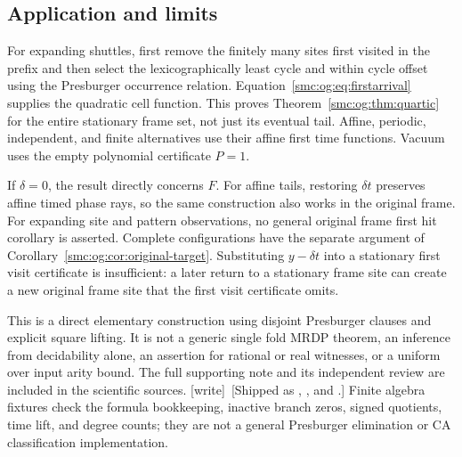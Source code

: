 \documentclass[11pt,letterpaper]{article}
\numberwithin{equation}{section}
\theoremstyle{definition}
\theoremstyle{remark}
\newcommand{\wtag}{\textup{[write]}}
\begin{document}
\subsection{Application and limits}
For expanding shuttles, first remove the finitely many sites first visited in the prefix and then select the lexicographically least cycle and within cycle offset using the Presburger occurrence relation. Equation~\eqref{smc:og:eq:firstarrival} supplies the quadratic cell function. This proves Theorem~\ref{smc:og:thm:quartic} for the entire stationary frame set, not just its eventual tail. Affine, periodic, independent, and finite alternatives use their affine first time functions. Vacuum uses the empty polynomial certificate $P=1$.

If $\delta=0$, the result directly concerns $F$. For affine tails, restoring $\delta t$ preserves affine timed phase rays, so the same construction also works in the original frame. For expanding site and pattern observations, no general original frame first hit corollary is asserted. Complete configurations have the separate argument of Corollary~\ref{smc:og:cor:original-target}. Substituting $y-\delta t$ into a stationary first visit certificate is insufficient: a later return to a stationary frame site can create a new original frame site that the first visit certificate omits.

This is a direct elementary construction using disjoint Presburger clauses and explicit square lifting. It is not a generic single fold MRDP theorem, an inference from decidability alone, an assertion for rational or real witnesses, or a uniform over input arity bound. The full supporting note and its independent review are included in the scientific sources. \wtag\ [Shipped as , ,  and .] Finite algebra fixtures check the formula bookkeeping, inactive branch zeros, signed quotients, time lift, and degree counts; they are not a general Presburger elimination or CA classification implementation.
\end{document}
